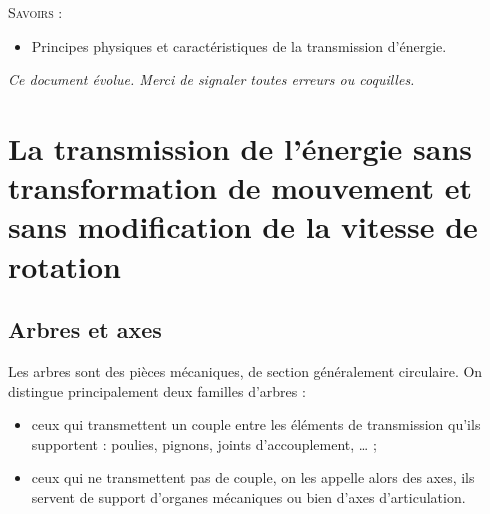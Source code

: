 \documentclass[11pt,oneside]{article}
\begin{document}
\vspace{.25cm}







\begin{savoir}
\textsc{Savoirs :}
\begin{itemize}
\item Principes physiques et caractéristiques de la transmission d'énergie.
\end{itemize}
\end{savoir}
 

\setlength{\parskip}{0ex plus 0.2ex minus 0ex}
 \renewcommand{\contentsname}{}
 \renewcommand{\baselinestretch}{1}

\tableofcontents

 \renewcommand{\baselinestretch}{1.2}
\setlength{\parskip}{2ex plus 0.5ex minus 0.2ex}

\textit{Ce document évolue. Merci de signaler toutes erreurs ou coquilles.}

\section{La transmission de l'énergie sans transformation de mouvement et sans modification de la vitesse de rotation}


\subsection{Arbres et axes}

Les arbres sont des pièces mécaniques, de section généralement circulaire.
On distingue principalement deux familles d’arbres :
\begin{itemize}
\item ceux qui transmettent un couple entre les éléments de transmission qu’ils supportent : poulies, pignons, joints d’accouplement, … ;
\item ceux qui ne transmettent pas de couple, on les appelle alors des axes, ils servent de support d’organes mécaniques ou bien d’axes d’articulation.
\end{itemize}
\end{document}

